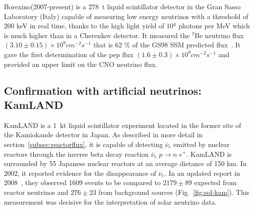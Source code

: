 Borexino(2007-present) is a 278~t liquid scintillator detector in the Gran Sasso Laboratory (Italy)
capable of measuring low energy neutrinos with a threshold of 200 keV in real time, thanks to the high light yield of 10$^4$ photons per MeV which is much higher than in a Cherenkov detector. 
It measured the $^7$Be neutrino flux $(3.10 \pm 0.15) \times 10^9 cm^{-2} s^{-1}$ that is 62 \% of the GS98 SSM predicted flux~\cite{bellini}. It gave the first determination of the pep flux 
$(1.6 \pm 0.3) \times 10^8 cm^{-2} s^{-1}$ and provided an upper limit on the CNO neutrino flux.


\subsection{Confirmation with artificial neutrinos: KamLAND}

KamLAND is a 1~kt liquid scintillator experiment located in the former site of the Kamiokande detector in Japan. As described in more detail in section~\ref{subsec:reactorflux}, it is capable of detecting $\bar \nu_e$ emitted by nuclear reactors through the inverse beta decay reaction $\bar{\nu}_e \; p \rightarrow n \;  e^+$. KamLAND is surrounded by 55 Japanese nuclear reactors at an average distance of 150 km. In 2002, it reported  evidence for the disappearance  of $\bar \nu_e$. In an updated report in 2008~\cite{kamland}, they observed 1609 
events to be compared to $2179 \pm 89$ expected from reactor neutrinos and  $276 \pm 23$ from background sources (Fig.~\ref{fig:sol-kam}). This measurement was decisive for the interpretation of solar neutrino data.



